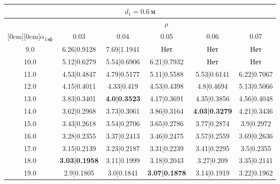 \documentclass[20pt]{article}
\begin{document}
\begin{center}
\begin{tabular}{c|ccccc}
\hline
	\multicolumn{6}{c}{$d_{1}=0.6 \ м$} \\
\hline
	 & \multicolumn{5}{|c}{$\rho$} \\
	\cline{2-6}
	\raisebox{1.5ex}[0cm][0cm]{$\alpha_{1эф}$} & 0.03 & 0.04 & 0.05 & 0.06 & 0.07\\
\hline
	9.0 & 	6.26|0.9128 & 	7.69|1.1941 & 	Нет & 	Нет & 	Нет\\
	10.0 & 	5.12|0.6279 & 	5.54|0.6906 & 	6.21|0.7932 & 	Нет & 	Нет\\
	11.0 & 	4.53|0.4847 & 	4.79|0.5177 & 	5.11|0.5588 & 	5.53|0.6141 & 	6.22|0.7067\\
	12.0 & 	4.15|0.4011 & 	4.33|0.419 & 	4.53|0.4398 & 	4.8|0.4694 & 	5.13|0.5066\\
	13.0 & 	3.83|0.3401 & 	\textbf{4.0|0.3523} & 	4.17|0.3691 & 	4.35|0.3856 & 	4.56|0.4048\\
	14.0 & 	3.62|0.2968 & 	3.73|0.3061 & 	3.86|0.3164 & 	\textbf{4.03|0.3279} & 	4.21|0.3436\\
	15.0 & 	3.43|0.2618 & 	3.54|0.2706 & 	3.65|0.2786 & 	3.77|0.2874 & 	3.9|0.2972\\
	16.0 & 	3.28|0.2355 & 	3.37|0.2413 & 	3.46|0.2475 & 	3.57|0.2559 & 	3.69|0.2636\\
	17.0 & 	3.15|0.2139 & 	3.23|0.2187 & 	3.31|0.2239 & 	3.41|0.2295 & 	3.5|0.2355\\
	18.0 & 	\textbf{3.03|0.1958} & 	3.11|0.1999 & 	3.18|0.2043 & 	3.27|0.209 & 	3.35|0.2141\\
	19.0 & 	2.9|0.1805 & 	3.0|0.1841 & 	\textbf{3.07|0.1878} & 	3.14|0.1919 & 	3.22|0.1962\\
\end{tabular}


\end{center}
\end{document}
